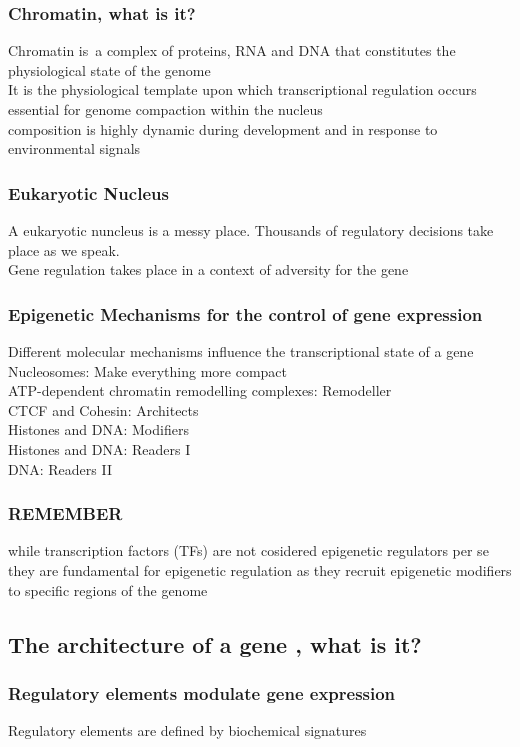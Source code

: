 \begin{itemize}
\begin{itemize}
\subsubsection{Chromatin, what is it?}
Chromatin is a complex of proteins, RNA and DNA that constitutes the physiological state of the genome
\\It is the physiological template upon which transcriptional regulation occurs
\\essential for genome compaction within the nucleus
\\composition is highly dynamic during development and in response to environmental signals

\subsubsection{Eukaryotic Nucleus}
A eukaryotic nuncleus is a messy place. Thousands of regulatory decisions take place as we speak.
\\Gene regulation takes place in a context of adversity for the gene

\subsubsection{Epigenetic Mechanisms for the control of gene expression}
Different molecular mechanisms influence the transcriptional state of a gene
\\Nucleosomes: Make everything more compact
\\ATP-dependent chromatin remodelling complexes: Remodeller
\\CTCF and Cohesin: Architects
\\Histones and DNA: Modifiers
\\Histones and DNA: Readers I
\\DNA: Readers II

\subsubsection{REMEMBER}
while transcription factors (TFs) are not cosidered epigenetic regulators per se they are fundamental for epigenetic regulation as they recruit epigenetic modifiers to specific regions of the genome 


\subsection{The architecture of a gene
, what is it?}
\subsubsection{Regulatory elements modulate gene expression}
Regulatory elements are defined by biochemical signatures


\end{itemize}
\end{itemize}
